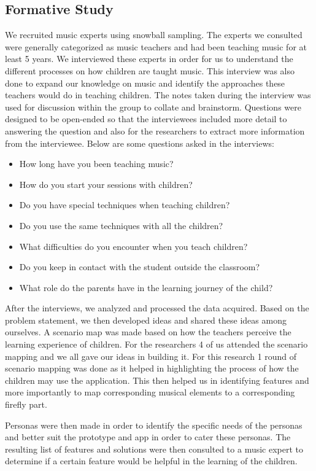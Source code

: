 \subsection{Formative Study}
We recruited music experts using snowball sampling. The experts we consulted were generally categorized as music teachers and had been teaching music for at least 5 years. We interviewed these experts in order for us to understand the different processes on how children are taught music. This interview was also done to expand our knowledge on music and identify the approaches these teachers would do in teaching children. The notes taken during the interview was used for discussion within the group to collate and brainstorm. Questions were designed to be open-ended so that the interviewees included more detail to answering the question and also for the researchers to extract more information from the interviewee. Below are some questions asked in the interviews:

\begin{itemize}
    \item How long have you been teaching music?
    \item How do you start your sessions with children?
    \item Do you have special techniques when teaching children?
    \item Do you use the same techniques with all the children?
    \item What difficulties do you encounter when you teach children?
    \item Do you keep in contact with the student outside the classroom?
    \item What role do the parents have in the learning journey of the child?
\end{itemize}

After the interviews, we analyzed and processed the data acquired. Based on the problem statement, we then developed ideas and shared these ideas among ourselves. A scenario map was made based on how the teachers perceive the learning experience of children. For the researchers 4 of us attended the scenario mapping and we all gave our ideas in building it. For this research 1 round of scenario mapping was done as it helped in highlighting the process of how the children may use the application. This then helped us in identifying features and more importantly to map corresponding musical elements to a corresponding firefly part. 

Personas were then made in order to identify the specific needs of the personas and better suit the prototype and app in order to cater these personas. The resulting list of features and solutions were then consulted to a music expert to determine if a certain feature would be helpful in the learning of the children.

